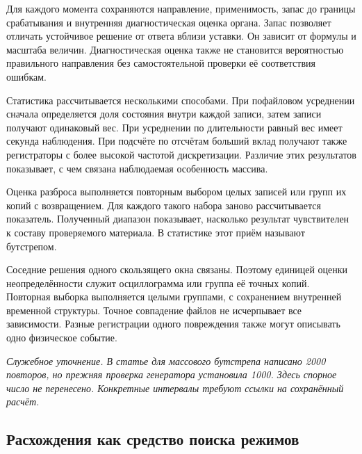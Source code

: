 Для каждого момента сохраняются направление,
применимость, запас до границы срабатывания
и внутренняя диагностическая оценка органа.
Запас позволяет отличать устойчивое решение
от ответа вблизи уставки. Он зависит от формулы
и масштаба величин. Диагностическая оценка также
не становится вероятностью правильного направления
без самостоятельной проверки её соответствия ошибкам.

Статистика рассчитывается несколькими способами.
При пофайловом усреднении сначала определяется доля
состояния внутри каждой записи, затем записи получают
одинаковый вес. При усреднении по длительности
равный вес имеет секунда наблюдения. При подсчёте
по отсчётам больший вклад получают также регистраторы
с более высокой частотой дискретизации.
Различие этих результатов показывает, с чем связана
наблюдаемая особенность массива.

Оценка разброса выполняется повторным выбором целых записей
или групп их копий с возвращением. Для каждого такого набора
заново рассчитывается показатель. Полученный диапазон показывает,
насколько результат чувствителен к составу проверяемого материала.
В статистике этот приём называют бутстрепом.

Соседние решения одного скользящего окна связаны.
Поэтому единицей оценки неопределённости служит
осциллограмма или группа её точных копий.
Повторная выборка выполняется целыми группами,
с сохранением внутренней временной структуры.
Точное совпадение файлов не исчерпывает все зависимости.
Разные регистрации одного повреждения также могут
описывать одно физическое событие.
\ifdefined\AuthorReview
\par\smallskip\textit{Служебное уточнение. В статье для массового
бутстрепа написано 2000 повторов, но прежняя проверка
генератора установила 1000. Здесь спорное число не перенесено.
Конкретные интервалы требуют ссылки на сохранённый расчёт.}\par
\fi

{}


\subsection{Расхождения как средство поиска режимов}

